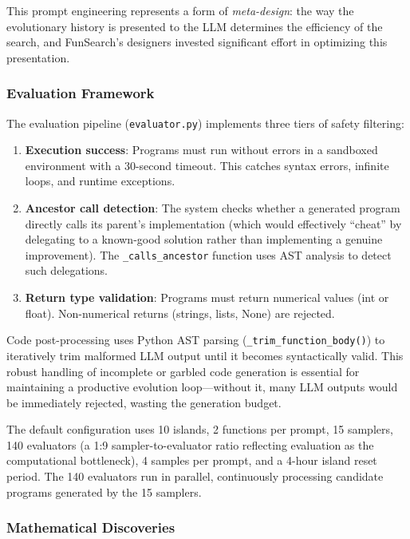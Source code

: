 This prompt engineering represents a form of \emph{meta-design}: the way the evolutionary history is presented to the LLM determines the efficiency of the search, and FunSearch's designers invested significant effort in optimizing this presentation.

\subsubsection{Evaluation Framework}

The evaluation pipeline (\texttt{evaluator.py}) implements three tiers of safety filtering:

\begin{enumerate}
\item \textbf{Execution success}: Programs must run without errors in a sandboxed environment with a 30-second timeout. This catches syntax errors, infinite loops, and runtime exceptions.

\item \textbf{Ancestor call detection}: The system checks whether a generated program directly calls its parent's implementation (which would effectively ``cheat'' by delegating to a known-good solution rather than implementing a genuine improvement). The \texttt{\_calls\_ancestor} function uses AST analysis to detect such delegations.

\item \textbf{Return type validation}: Programs must return numerical values (int or float). Non-numerical returns (strings, lists, None) are rejected.
\end{enumerate}

Code post-processing uses Python AST parsing (\texttt{\_trim\_function\_body()}) to iteratively trim malformed LLM output until it becomes syntactically valid. This robust handling of incomplete or garbled code generation is essential for maintaining a productive evolution loop---without it, many LLM outputs would be immediately rejected, wasting the generation budget.

The default configuration uses 10 islands, 2 functions per prompt, 15 samplers, 140 evaluators (a 1:9 sampler-to-evaluator ratio reflecting evaluation as the computational bottleneck), 4 samples per prompt, and a 4-hour island reset period. The 140 evaluators run in parallel, continuously processing candidate programs generated by the 15 samplers.

\subsubsection{Mathematical Discoveries}

